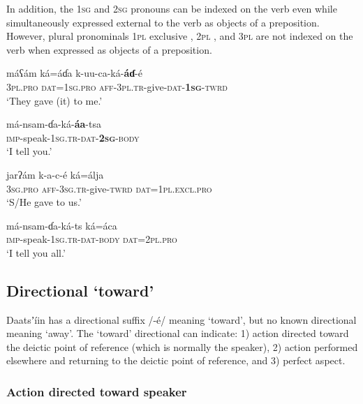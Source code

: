 \documentclass[output=paper]{langsci/langscibook}
\begin{document}
In addition, the \textsc{1sg}  and \textsc{2sg}  pronouns can be indexed on the verb even while simultaneously expressed external to the verb as objects of a preposition. However, plural pronominals \textsc{1pl} exclusive , 2\textsc{pl} , and 3\textsc{pl}  are not indexed on the verb when expressed as objects of a preposition.

\ea\label{ex:ahlandc:25}
\gll
máʕám  ká=áɗa  k-uu-ca-ká-\textbf{áɗ}{}-é  \\ 
\textsc{3pl.pro}  \textsc{dat=1sg.pro}  \textsc{aff-3pl.tr}{}-give-\textsc{dat}{}-\textbf{1}\textbf{\textsc{sg}}\textsc{{}-twrd} \\
\glt
‘They gave (it) to me.’
\z

\ea\label{ex:ahlandc:26}
\gll
má-nsam-ɗa-ká-\textbf{áa}{}-tsa \\
\textsc{imp}{}-speak-\textsc{1sg.tr}{}-\textsc{dat}{}-\textbf{\textsc{2sg}}{}-\textsc{body} \\ 
\glt
‘I tell you.’
\z

\ea\label{ex:ahlandc:27}
\gll
jarʔám     k-a-c-é    ká=álja  \\ 
3\textsc{sg.pro}  \textsc{aff-3sg.tr}{}-give-\textsc{twrd}  \textsc{dat=1pl.excl.pro} \\
\glt
‘S/He gave to us.’
\z

\ea\label{ex:ahlandc:28}
\gll
má-nsam-ɗa-ká-ts    ká=áca \\
\textsc{imp}{}-speak-\textsc{1sg.tr-dat-body}  \textsc{dat=2pl.pro} \\
\glt
‘I tell you all.’
\z

\subsection{Directional ‘toward’}\label{sec:ahlandc:4.6}

Daatsʼíin has a directional suffix /-é/ meaning ‘toward’, but no known directional meaning ‘away’. The ‘toward’ directional can indicate: 1) action directed toward the deictic point of reference (which is normally the speaker), 2) action performed elsewhere and returning to the deictic point of reference, and 3) perfect aspect.

\subsubsection{Action directed toward speaker}\label{sec:ahlandc:4.6.1}
\end{document}
